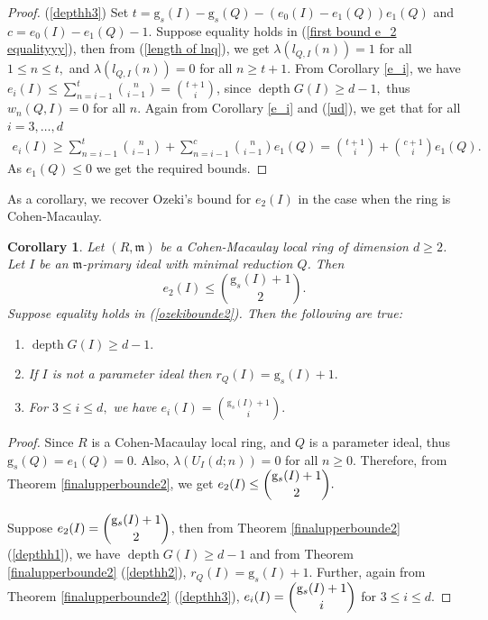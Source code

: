 \documentclass[reqno,a4paper,dvipsnames]{amsart}
\newcommand{\m}{\mathfrak{m} }
\newcommand{\depth}{\operatorname{depth}}
\newtheorem{corollary}[theorem]{Corollary}
\theoremstyle{definition}
\begin{document}
\begin{proof}
(\ref{depthh3})
Set $t=\mathrm{g}_{s}(I)-\mathrm{g}_s(Q) - (e_{0}(I)-e_{1}(Q))e_1(Q)$  and $c=e_{0}(I)-e_{1}(Q)-1.$ Suppose equality holds in (\ref{first bound e_2 equalityyy}), then from   (\ref{length of lnq}), we get  $\lambda( l_{Q,I}(n) )=1$ for all $1 \leq n \leq t,$ and $\lambda( l_{Q,I}(n) )=0$ for all $n \geq t+1.$  From Corollary \ref{e_i}, we have $e_{i}(I)\leq \displaystyle\sum_{n= i-1}^{t}\binom{n}{i-1}=\binom{t+1}{i}$,  since $\depth G(I) \geq d-1,$ thus $w_{n}(Q,I)=0$ for all $n.$ 
Again from Corollary \ref{e_i} and (\ref{ud}), we get that for all $i=3, \ldots, d$
\begin{eqnarray*}
    e_{i}(I)
\geq  \sum_{n=i-1}^{t} \binom{n}{i-1} + \sum_{n=i-1}^c \binom{n }{i-1}e_1(Q)=\binom{t+1}{i}+\binom{c+1}{i}e_1(Q).
\end{eqnarray*}
As $e_1(Q)\leq 0$ we get the required bounds.
  \end{proof}



As a  corollary, we recover Ozeki's bound \cite[Proposition 3.2]{ozeki} for  $e_{2}(I)$ in the case when the ring   is Cohen-Macaulay. 

  \begin{corollary}\cite[Proposition 3.2, Theorem 3.4]{ozeki}\label{cml}
     Let $(R,\m)$ be a Cohen-Macaulay local ring of dimension $d\geq 2$. Let $I$ be an $\m$-primary ideal with minimal reduction  $Q$. 
    Then
    \begin{equation} \label{ozekibounde2}
        e_2(I)
\leq \displaystyle\binom{\mathrm{g}_s(I)  + 1}{2}.
    \end{equation}
    Suppose equality holds in  (\ref{ozekibounde2}). Then the following are true:
        \begin{enumerate} [\normalfont(i)]
      \item  $\depth G(I) \geq d-1.$
\item  If $I$ is not a parameter ideal  then 
          $r_{Q}(I)=\mathrm{g}_s(I) +1.$
\item 
For $3 \leq i \leq d,$ we have $ e_{i}(I) =\displaystyle\binom{\mathrm{g}_s(I)  + 1}{i}.$
    \end{enumerate}
\end{corollary}

\begin{proof}
    Since $R$ is a Cohen-Macaulay local ring,  and $Q$ is a parameter ideal, thus
$\mathrm{g}_{s}(Q)=e_{1}(Q)=0$. Also,
 $\lambda (U_{I}(d;n)) = 0$ for all $n \geq 0$.  Therefore, from Theorem \ref{finalupperbounde2}, we get $e_{2}(I) \leq \dbinom{\mathrm{g}_{s}(I)+1}{2}.$
    
    Suppose $e_{2}(I) = \dbinom{\mathrm{g}_{s}(I)+1}{2}$, then from  Theorem \ref{finalupperbounde2} (\ref{depthh1}), we have $\depth G(I) \geq d-1$  and  from Theorem \ref{finalupperbounde2} (\ref{depthh2}), $r_{Q}(I)=\mathrm{g}_{s}(I)+1$. Further, again from  Theorem \ref{finalupperbounde2} (\ref{depthh3}),  $e_{i}(I)=\dbinom{\mathrm{g}_{s}(I)+1}{i}$ for $3 \leq i \leq d.$
\end{proof}
\end{document}
